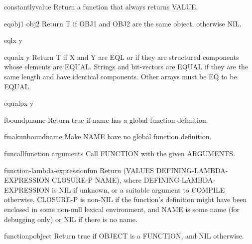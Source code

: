 \documentclass[10pt,english]{book}
\begin{document}
\begin{function}{constantly}{value}
  Return a function that always returns VALUE.
\end{function}

\begin{function}{eq}{obj1 obj2}
  Return T if OBJ1 and OBJ2 are the same object, otherwise NIL.
\end{function}

\begin{function}{eql}{x y}
  
\end{function}

\begin{function}{equal}{x y}
  Return T if X and Y are EQL or if they are structured components whose
elements are EQUAL. Strings and bit-vectors are EQUAL if they are the same
length and have identical components. Other arrays must be EQ to be EQUAL.
\end{function}

\begin{function}{equalp}{x y}
  
\end{function}

\begin{function}{fboundp}{name}
  Return true if name has a global function definition.
\end{function}

\begin{function}{fmakunbound}{name}
  Make NAME have no global function definition.
\end{function}

\begin{function}{funcall}{function \rest arguments}
  Call FUNCTION with the given ARGUMENTS.
\end{function}

\begin{function}{function-lambda-expression}{fun}
  Return (VALUES DEFINING-LAMBDA-EXPRESSION CLOSURE-P NAME), where
  DEFINING-LAMBDA-EXPRESSION is NIL if unknown, or a suitable argument
  to COMPILE otherwise, CLOSURE-P is non-NIL if the function's definition
  might have been enclosed in some non-null lexical environment, and
  NAME is some name (for debugging only) or NIL if there is no name.
\end{function}

\begin{function}{functionp}{object}
  Return true if OBJECT is a FUNCTION, and NIL otherwise.
\end{function}
\end{document}
